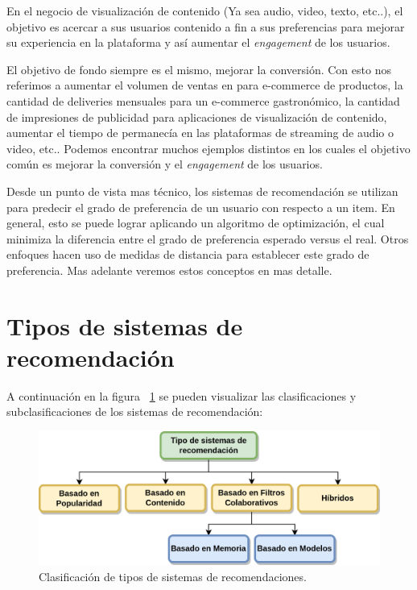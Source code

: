 \documentclass[11pt,a4paper,twoside]{thesis}
\begin{document}
En el negocio de visualización de contenido (Ya sea audio, video, texto, etc..), el objetivo es acercar a sus usuarios contenido a fin a sus preferencias para mejorar su experiencia en la plataforma y así aumentar el \textit{engagement} de los usuarios.

El objetivo de fondo siempre es el mismo, mejorar la conversión. Con esto nos referimos a aumentar el volumen de ventas en para e-commerce de productos, la cantidad de deliveries mensuales para un e-commerce gastronómico, la cantidad de impresiones de publicidad para aplicaciones de visualización de contenido, aumentar el tiempo de permanecía en las plataformas de streaming de audio o video, etc.. Podemos encontrar muchos ejemplos distintos en los cuales el objetivo común es mejorar la conversión y el \textit{engagement} de los usuarios.

Desde un punto de vista mas técnico, los sistemas de recomendación se utilizan para predecir el grado de preferencia de un usuario con respecto a un item. En general, esto se puede lograr aplicando un algoritmo de optimización, el cual minimiza la diferencia entre el grado de preferencia esperado versus el real. Otros enfoques hacen uso de medidas de distancia para establecer este grado de preferencia. Mas adelante veremos estos conceptos en mas detalle.

\clearpage
\section{Tipos de sistemas de recomendación}

A continuación en la figura ~\ref{fig:clasification} se pueden visualizar las clasificaciones y subclasificaciones de los sistemas de recomendación:

\begin{figure}[!htb]
	\centering
	\includegraphics[width=12cm]{./images/clasificacion-sis-rec.png}
	\caption{Clasificación de tipos de sistemas de recomendaciones.}
	\label{fig:clasification}
\end{figure}
\end{document}
